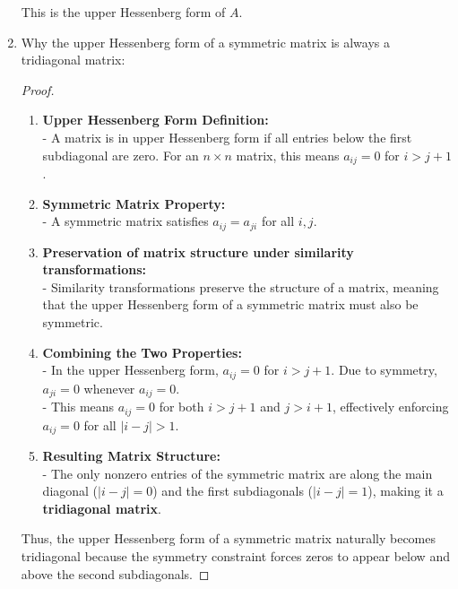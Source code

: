 \documentclass[12pt]{article}
\begin{document}
\begin{enumerate}[label=(\alph*)]
        This is the upper Hessenberg form of $A$.
    \item Why the upper Hessenberg form of a symmetric matrix is always a tridiagonal matrix:
        \begin{proof} $ $\newline
            \begin{enumerate}[label=(\roman*)]
                \item \textbf{Upper Hessenberg Form Definition:}\\
                - A matrix is in upper Hessenberg form if all entries below the first subdiagonal are zero. For an \( n \times n \) matrix, this means \( a_{ij} = 0 \) for \( i > j + 1 \).
             
                \item \textbf{Symmetric Matrix Property:}\\
                - A symmetric matrix satisfies \( a_{ij} = a_{ji} \) for all \( i, j \).
                
                \item \textbf{Preservation of matrix structure under similarity transformations:}\\
                - Similarity transformations preserve the structure of a matrix, meaning that the upper Hessenberg form of a symmetric matrix must also be symmetric.

                \item \textbf{Combining the Two Properties:}\\
                - In the upper Hessenberg form, \( a_{ij} = 0 \) for \( i > j + 1 \). Due to symmetry, \( a_{ji} = 0 \) whenever \( a_{ij} = 0 \). \\
                - This means \( a_{ij} = 0 \) for both \( i > j + 1 \) and \( j > i + 1 \), effectively enforcing \( a_{ij} = 0 \) for all \( |i - j| > 1 \).
             
                \item \textbf{Resulting Matrix Structure:}\\
                - The only nonzero entries of the symmetric matrix are along the main diagonal (\( |i - j| = 0 \)) and the first subdiagonals (\( |i - j| = 1 \)), making it a \textbf{tridiagonal matrix}.
            \end{enumerate}
            Thus, the upper Hessenberg form of a symmetric matrix naturally becomes tridiagonal because the symmetry constraint forces zeros to appear below and above the second subdiagonals.
        \end{proof}
\end{enumerate}
\end{document}
